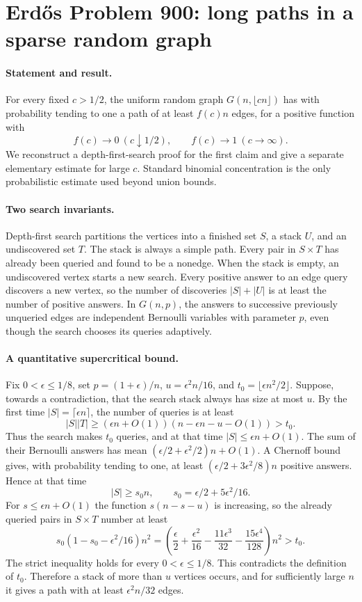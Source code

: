 \section*{Erd\H{o}s Problem 900: long paths in a sparse random graph}

\paragraph{Statement and result.}
For every fixed \(c>1/2\), the uniform random graph
\(G(n,\lfloor cn\rfloor)\) has with probability tending to one
a path of at least \(f(c)n\) edges, for a positive function with
\[
 f(c)\longrightarrow0\ (c\downarrow1/2),\qquad
 f(c)\longrightarrow1\ (c\to\infty).
\]
We reconstruct a depth-first-search proof for the first
claim and give a separate elementary estimate for large \(c\).
Standard binomial concentration is the only probabilistic
estimate used beyond union bounds.

\paragraph{Two search invariants.}
Depth-first search partitions the vertices into a finished
set \(S\), a stack \(U\), and an undiscovered set \(T\).
The stack is always a simple path. Every pair in \(S\times T\)
has already been queried and found to be a nonedge.
When the stack is empty, an undiscovered vertex starts a
new search. Every positive answer to an edge query discovers
a new vertex, so the number of discoveries \(|S|+|U|\)
is at least the number of positive answers.
In \(G(n,p)\), the answers to successive previously unqueried
edges are independent Bernoulli variables with parameter \(p\),
even though the search chooses its queries adaptively.

\paragraph{A quantitative supercritical bound.}
Fix \(0<\epsilon\leq1/8\), set \(p=(1+\epsilon)/n\),
\(u=\epsilon^2n/16\), and \(t_0=\lfloor\epsilon n^2/2\rfloor\).
Suppose, towards a contradiction, that the search stack
always has size at most \(u\).
By the first time \(|S|=\lceil\epsilon n\rceil\), the number
of queries is at least
\[
 |S||T|\geq(\epsilon n+O(1))
               (n-\epsilon n-u-O(1))>t_0.
\]
Thus the search makes \(t_0\) queries, and at that time
\(|S|\leq\epsilon n+O(1)\).
The sum of their Bernoulli answers has mean
\((\epsilon/2+\epsilon^2/2)n+O(1)\). A Chernoff bound gives,
with probability tending to one, at least
\((\epsilon/2+3\epsilon^2/8)n\) positive answers.
Hence at that time
\[
 |S|\geq s_0n,\qquad s_0=\epsilon/2+5\epsilon^2/16.
\]
For \(s\leq\epsilon n+O(1)\) the function \(s(n-s-u)\)
is increasing, so the already queried pairs in \(S\times T\)
number at least
\[
 s_0(1-s_0-\epsilon^2/16)n^2
 =\left(\frac\epsilon2+\frac{\epsilon^2}{16}
       -\frac{11\epsilon^3}{32}
       -\frac{15\epsilon^4}{128}\right)n^2
 >t_0.
\]
The strict inequality holds for every \(0<\epsilon\leq1/8\).
This contradicts the definition of \(t_0\).
Therefore a stack of more than \(u\) vertices occurs,
and for sufficiently large \(n\) it gives a path with
at least \(\epsilon^2n/32\) edges.

